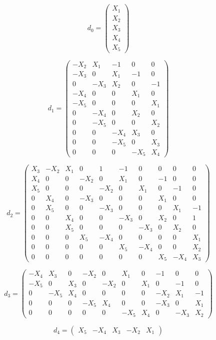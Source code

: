 \documentclass[reqno,12pt]{amsart}
\theoremstyle{plain}
\theoremstyle{definition}
\begin{document}
$$
d_0=\left(\begin{array}{c}
X_1\\
X_2\\
\hline
X_3\\
\hline
X_4\\
X_5
\end{array}\right)
$$

$$
d_1=\left(\begin{array}{cc|c|cc}
-X_2&X_1&-1&0&0\\
\hline
-X_3&0&X_1&-1&0\\
0&-X_3&X_2&0&-1\\
\hline
-X_4&0&0&X_1&0\\
-X_5&0&0&0&X_1\\
0&-X_4&0&X_2&0\\
0&-X_5&0&0&X_2\\
\hline
0&0&-X_4&X_3&0\\
\hline
0&0&-X_5&0&X_3\\
0&0&0&-X_5&X_4
\end{array}\right)
$$

$$
d_2=\left(\begin{array}{c|cc|cccc|cc|c}
X_3&-X_2&X_1&0&1&-1&0&0&0&0\\
\hline
X_4&0&0&-X_2&0&X_1&0&-1&0&0\\
X_5&0&  0& 0&  -X_2&0&  X_1& 0& -1& 0\\
\hline
0& X_4& 0& -X_3&0&  0&  0&  X_1&0&  0\\
0& X_5& 0& 0&  -X_3&0&  0&  0& X_1& -1\\
0& 0&  X_4&0&  0&  -X_3&0&  X_2&0&  1\\
0& 0&  X_5&0&  0&  0&  -X_3&0& X_2& 0\\
\hline
0& 0&  0& X_5& -X_4&0&  0&  0& 0&  X_1\\
0& 0&  0& 0&  0&  X_5& -X_4&0& 0&  X_2\\
\hline
0& 0&  0& 0&  0&  0&  0&  X_5&-X_4&X_3
\end{array}\right)
$$

$$
d_3=\left(\begin{array}{c|cc|cccc|cc|c}
-X_4&X_3&0&-X_2&0&X_1&0&-1&0&0\\
-X_5&0&X_3&0&-X_2&0&X_1&0&-1&0\\
\hline
0&-X_5&X_4&0&0&0&0&-X_2&X_1&-1\\
\hline
0&0&0&-X_5&X_4&0&0&-X_3&0&X_1\\
0&0&0&0&0&-X_5&X_4&0&-X_3&X_2
\end{array}\right)
$$

$$
d_4=\left(\begin{array}{cc|c|cc}
X_5&-X_4&X_3&-X_2&X_1
\end{array}\right)
$$
\end{document}
